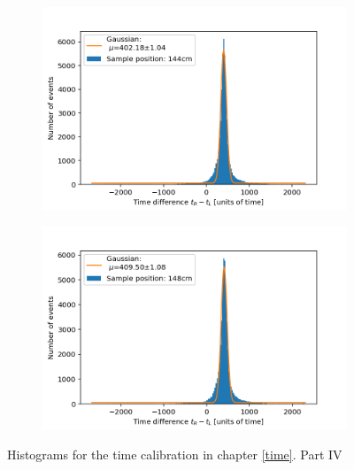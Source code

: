 \documentclass[]{article}
\begin{document}
\begin{figure}[H]
\medskip
\begin{subfigure}{0.48\textwidth}
\includegraphics[width=\linewidth]{Plots/Pos/144cm.png}
\end{subfigure}
\begin{subfigure}[c]{0.48\linewidth}
\includegraphics[width=\linewidth]{Plots/Pos/148cm.png}
\end{subfigure}
\caption{Histograms for the time calibration in chapter \ref{time}. Part IV }
\end{figure}
\end{document}
